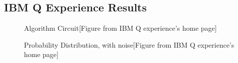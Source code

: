 \documentclass{article}
\begin{document}
\subsection{IBM Q Experience Results}
\begin{figure}[H]
\centering 
\noindent{}%
\caption{Algorithm Circuit[Figure from IBM Q experience’s home page]}
\end{figure}
\begin{figure}[H]
\centering 
\noindent{}%
\caption{Probability Distribution, with noise[Figure from IBM Q experience’s home page]}
\end{figure}
\end{document}
